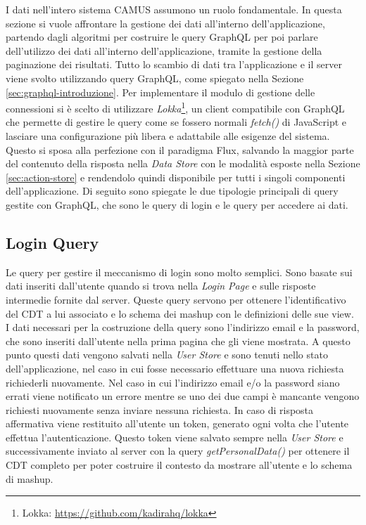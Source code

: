 I dati nell'intero sistema CAMUS assumono un ruolo fondamentale. In questa sezione si vuole affrontare la gestione dei dati all'interno dell'applicazione, partendo dagli algoritmi per costruire le query GraphQL per poi parlare dell'utilizzo dei dati all'interno dell'applicazione, tramite la gestione della paginazione dei risultati.
Tutto lo scambio di dati tra l'applicazione e il server viene svolto utilizzando query GraphQL, come spiegato nella Sezione \ref{sec:graphql-introduzione}. Per implementare il modulo di gestione delle connessioni si è scelto di utilizzare \emph{Lokka}\footnote{Lokka: \url{https://github.com/kadirahq/lokka}}, un client compatibile con GraphQL che permette di gestire le query come se fossero normali \emph{fetch()} di JavaScript e lasciare una configurazione più libera e adattabile alle esigenze del sistema. Questo si sposa alla perfezione con il paradigma Flux, salvando la maggior parte del contenuto della risposta nella \emph{Data Store} con le modalità esposte nella Sezione \ref{sec:action-store} e rendendolo quindi disponibile per tutti i singoli componenti dell'applicazione. Di seguito sono spiegate le due tipologie principali di query gestite con GraphQL, che sono le query di login e le query per accedere ai dati.

\subsection{Login Query}

Le query per gestire il meccanismo di login sono molto semplici. Sono basate sui dati inseriti dall'utente quando si trova nella \emph{Login Page} e sulle risposte intermedie fornite dal server. Queste query servono per ottenere l'identificativo del CDT a lui associato e lo schema dei mashup con le definizioni delle sue view.
I dati necessari per la costruzione della query sono l'indirizzo email e la password, che sono inseriti dall'utente nella prima pagina che gli viene mostrata. A questo punto questi dati vengono salvati nella \emph{User Store} e sono tenuti nello stato dell'applicazione, nel caso in cui fosse necessario effettuare una nuova richiesta richiederli nuovamente. Nel caso in cui l'indirizzo email e/o la password siano errati viene notificato un errore mentre se uno dei due campi è mancante vengono richiesti nuovamente senza inviare nessuna richiesta.
In caso di risposta affermativa viene restituito all'utente un token, generato ogni volta che l'utente effettua l'autenticazione. Questo token viene salvato sempre nella \emph{User Store} e successivamente inviato al server con la query \emph{getPersonalData()} per ottenere il CDT completo per poter costruire il contesto da mostrare all'utente e lo schema di mashup.

